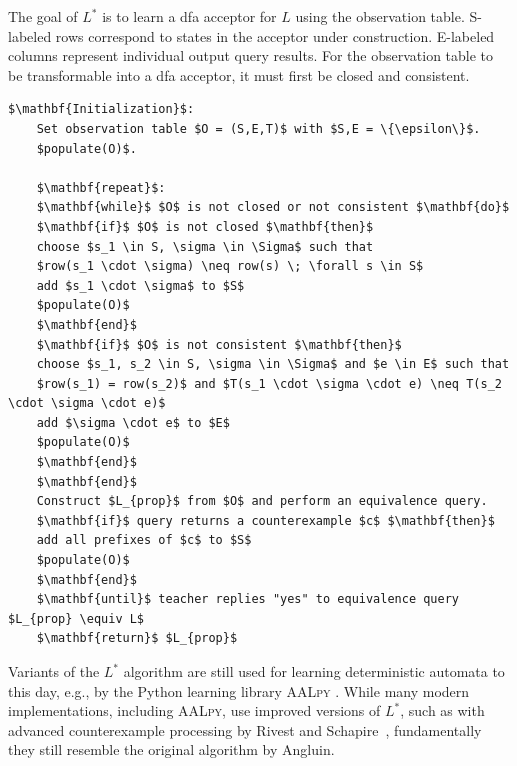 The goal of $L^*$ is to learn a \ac{dfa} acceptor for $L$ using the observation table. S-labeled rows correspond to states in the acceptor under construction. E-labeled columns represent individual output query results. For the observation table to be transformable into a \ac{dfa} acceptor, it must first be closed and consistent.

\begin{lstlisting}[mathescape=true, float=b, caption=$L^*$ algorithm, label=lst:lstar]
	$\mathbf{Initialization}$: 
	Set observation table $O = (S,E,T)$ with $S,E = \{\epsilon\}$.
	$populate(O)$.
	
	$\mathbf{repeat}$:
	$\mathbf{while}$ $O$ is not closed or not consistent $\mathbf{do}$
	$\mathbf{if}$ $O$ is not closed $\mathbf{then}$
	choose $s_1 \in S, \sigma \in \Sigma$ such that
	$row(s_1 \cdot \sigma) \neq row(s) \; \forall s \in S$
	add $s_1 \cdot \sigma$ to $S$
	$populate(O)$
	$\mathbf{end}$
	$\mathbf{if}$ $O$ is not consistent $\mathbf{then}$
	choose $s_1, s_2 \in S, \sigma \in \Sigma$ and $e \in E$ such that
	$row(s_1) = row(s_2)$ and $T(s_1 \cdot \sigma \cdot e) \neq T(s_2 \cdot \sigma \cdot e)$
	add $\sigma \cdot e$ to $E$
	$populate(O)$
	$\mathbf{end}$		
	$\mathbf{end}$
	Construct $L_{prop}$ from $O$ and perform an equivalence query.	
	$\mathbf{if}$ query returns a counterexample $c$ $\mathbf{then}$
	add all prefixes of $c$ to $S$
	$populate(O)$
	$\mathbf{end}$
	$\mathbf{until}$ teacher replies "yes" to equivalence query $L_{prop} \equiv L$
	$\mathbf{return}$ $L_{prop}$
\end{lstlisting}
\fi

Variants of the $L^*$ algorithm are still used for learning deterministic automata to this day, e.g., by the Python learning library \textsc{AALpy} \cite{software:aalpy}. While many modern implementations, including \textsc{AALpy}, use improved versions of $L^*$, such as with advanced counterexample processing by Rivest and Schapire~\cite{Rivest1993Inference}, fundamentally they still resemble the original algorithm by Angluin. 

